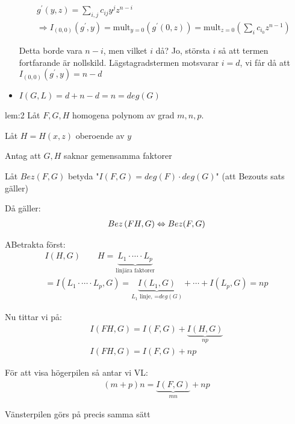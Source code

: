 \begin{prf}
\begin{itemize}
\begin{equation*}
        \begin{gathered}
          g^{\prime}(y,z) = \sum_{i,j}c_{ij}y^jz^{n-i}\\
          \Rightarrow I_{(0,0)}(g^{\prime},y) = \text{mult}_{y=0}\left(g^{\prime}(0,z)\right) = \text{mult}_{z=0}\left(\sum_ic_{i_0}z^{n-1}\right)
        \end{gathered}
      \end{equation*}\par
      \noindent Detta borde vara $n-i$, men vilket $i$ då? Jo, största $i$ så att termen fortfarande är nollskild. Lägstagradstermen motsvarar $i=d$, vi får då att $I_{(0,0)}(g^{\prime},y)=n-d$
    \item $I(G,L) = d+n-d=n=deg(G)$
  \end{itemize}
\end{prf}
\par\bigskip
\begin{lem}[2]{lem:2}
  Låt $F,G,H$ homogena polynom av grad $m,n,p$.\par
  \noindent Låt $H = H(x,z)$ oberoende av $y$\par
  \noindent Antag att $G,H$ saknar gemensamma faktorer\par
  \noindent Låt $Bez(F,G)$ betyda "$I(F,G)=deg(F)\cdot deg(G)$" (att Bezouts sats gäller)
  \par\bigskip
  \noindent Då gäller:
  \begin{equation*}
    \begin{gathered}
      Bez\left(FH,G\right)\Leftrightarrow Bez(F,G)
    \end{gathered}
  \end{equation*}
\end{lem}
\newpage
\begin{prf}
  ABetrakta först:
  \begin{equation*}
    \begin{gathered}
      I(H,G)\qquad H =\underbrace{L_1\cdot\cdots\cdot L_p}_{\text{linjära faktorer}} \\
      = I(L_1\cdot\cdots\cdot L_p, G) = \underbrace{I(L_1,G)}_{\text{$L_1$ linje, =$deg(G)$}}+\cdots+I(L_p,G) = np
    \end{gathered}
  \end{equation*}\par
  \noindent Nu tittar vi på:
  \begin{equation*}
    \begin{gathered}
    I(FH,G) = I(F,G) + \underbrace{I(H,G)}_{\text{$np$}}\\
    I(FH,G)=I(F,G)+np
    \end{gathered}
  \end{equation*}\par
  \noindent För att visa högerpilen så antar vi VL:
  \begin{equation*}
    \begin{gathered}
      (m+p)n = \underbrace{I(F,G)}_{\text{$mn$}}+np
    \end{gathered}
  \end{equation*}\par
  \noindent Vänsterpilen görs på precis samma sätt
\end{prf}
